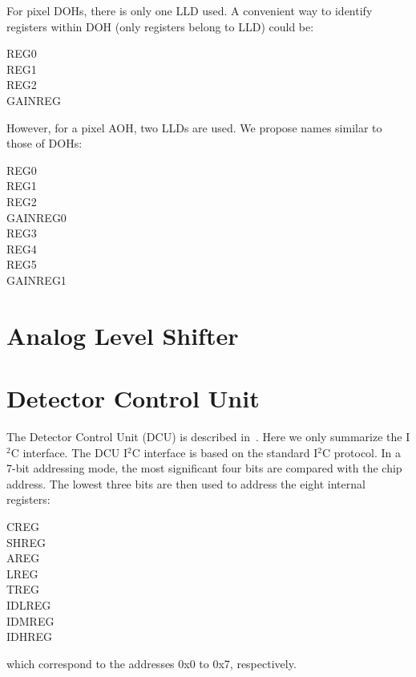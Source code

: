 \documentclass{cmspaper}
\begin{document}
\begin{appendix}
For pixel DOHs, there is only one LLD used. A convenient way to identify 
registers within DOH (only registers belong to LLD) could be:
\begin{description}
\item[REG0]
\item[REG1]
\item[REG2]
\item[GAINREG]
\end{description}
However, for a pixel AOH, two LLDs are used. 
We propose names similar to those of DOHs:
\begin{description}
\item[REG0]
\item[REG1]
\item[REG2]
\item[GAINREG0]
\item[REG3]
\item[REG4]
\item[REG5]
\item[GAINREG1]
\end{description}


\section{Analog Level Shifter \label{app:alt}}


\section{Detector Control Unit \label{app:dcu}}

The Detector Control Unit (DCU) is described in~\cite{DCU}. 
Here we only summarize the I$^2$C interface. 
The DCU I$^2$C interface is based on the standard I$^2$C protocol. In a 
7-bit addressing mode, the most significant four bits are compared 
with the chip address. The lowest three bits are then used to 
address the eight internal registers: 
\begin{description}
\item[CREG]
\item[SHREG]
\item[AREG]
\item[LREG]
\item[TREG]
\item[IDLREG]
\item[IDMREG]
\item[IDHREG]
\end{description}
which correspond to the addresses 0x0 to 0x7, respectively. 


\end{appendix}
\end{document}
